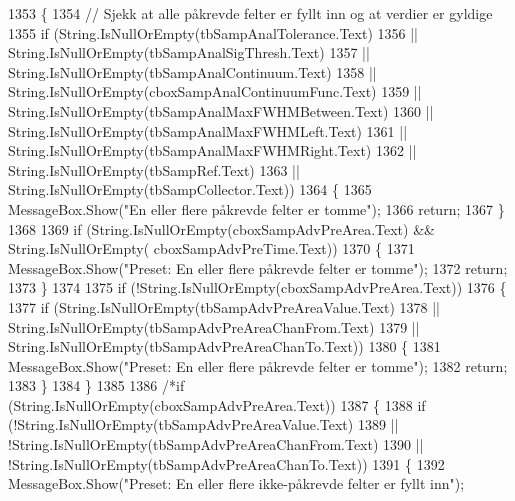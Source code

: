 \begin{DoxyCode}
1353         \{
1354             \textcolor{comment}{// Sjekk at alle påkrevde felter er fyllt inn og at verdier er gyldige}
1355             \textcolor{keywordflow}{if} (String.IsNullOrEmpty(tbSampAnalTolerance.Text)
1356                 || String.IsNullOrEmpty(tbSampAnalSigThresh.Text)
1357                 || String.IsNullOrEmpty(tbSampAnalContinuum.Text)
1358                 || String.IsNullOrEmpty(cboxSampAnalContinuumFunc.Text)
1359                 || String.IsNullOrEmpty(tbSampAnalMaxFWHMBetween.Text)
1360                 || String.IsNullOrEmpty(tbSampAnalMaxFWHMLeft.Text)
1361                 || String.IsNullOrEmpty(tbSampAnalMaxFWHMRight.Text)
1362                 || String.IsNullOrEmpty(tbSampRef.Text)
1363                 || String.IsNullOrEmpty(tbSampCollector.Text))
1364             \{
1365                 MessageBox.Show(\textcolor{stringliteral}{"En eller flere påkrevde felter er tomme"});
1366                 \textcolor{keywordflow}{return};
1367             \}
1368 
1369             \textcolor{keywordflow}{if} (String.IsNullOrEmpty(cboxSampAdvPreArea.Text) && String.IsNullOrEmpty(
      cboxSampAdvPreTime.Text))
1370             \{
1371                 MessageBox.Show(\textcolor{stringliteral}{"Preset: En eller flere påkrevde felter er tomme"});
1372                 \textcolor{keywordflow}{return};
1373             \}
1374 
1375             \textcolor{keywordflow}{if} (!String.IsNullOrEmpty(cboxSampAdvPreArea.Text))
1376             \{
1377                 \textcolor{keywordflow}{if} (String.IsNullOrEmpty(tbSampAdvPreAreaValue.Text)
1378                     || String.IsNullOrEmpty(tbSampAdvPreAreaChanFrom.Text)
1379                     || String.IsNullOrEmpty(tbSampAdvPreAreaChanTo.Text))
1380                 \{
1381                     MessageBox.Show(\textcolor{stringliteral}{"Preset: En eller flere påkrevde felter er tomme"});
1382                     \textcolor{keywordflow}{return};
1383                 \}   
1384             \}
1385 
1386             \textcolor{comment}{/*if (String.IsNullOrEmpty(cboxSampAdvPreArea.Text))}
1387 \textcolor{comment}{            \{}
1388 \textcolor{comment}{                if (!String.IsNullOrEmpty(tbSampAdvPreAreaValue.Text)}
1389 \textcolor{comment}{                    || !String.IsNullOrEmpty(tbSampAdvPreAreaChanFrom.Text)}
1390 \textcolor{comment}{                    || !String.IsNullOrEmpty(tbSampAdvPreAreaChanTo.Text))}
1391 \textcolor{comment}{                \{}
1392 \textcolor{comment}{                    MessageBox.Show("Preset: En eller flere ikke-påkrevde felter er fyllt inn");}

\end{DoxyCode}
